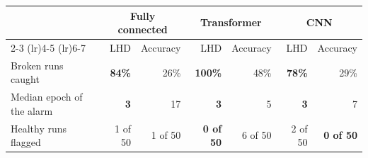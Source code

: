 \begin{tabular}{@{}lrrrrrr@{}}
\toprule
 & \multicolumn{2}{c}{Fully connected} & \multicolumn{2}{c}{Transformer} & \multicolumn{2}{c}{CNN} \\
\cmidrule(lr){2-3} \cmidrule(lr){4-5} \cmidrule(lr){6-7}
 & LHD & Accuracy & LHD & Accuracy & LHD & Accuracy \\
\midrule
Broken runs caught & \textbf{84\%} & 26\% & \textbf{100\%} & 48\% & \textbf{78\%} & 29\% \\
Median epoch of the alarm & \textbf{3} & 17 & \textbf{3} & 5 & \textbf{3} & 7 \\
Healthy runs flagged & 1 of 50 & 1 of 50 & \textbf{0 of 50} & 6 of 50 & 2 of 50 & \textbf{0 of 50} \\
\bottomrule
\end{tabular}
